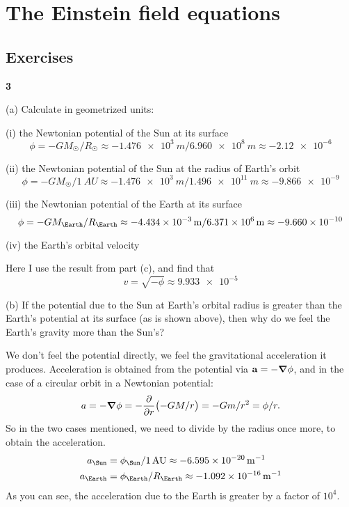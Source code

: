 \documentclass[gr-notes.tex]{subfiles}
\begin{document}
\setcounter{chapter}{7}

\chapter{The Einstein field equations}

\setcounter{section}{5}

\section{Exercises}

\textbf{3}

(a) Calculate in geometrized units:

(i) the Newtonian potential of the Sun at its surface
%
\begin{displaymath}
  \phi =
 -G M_\Sun / R_\Sun \approx
 -\SI{1.476e3}{m} / \SI{6.960e8}{m} \approx
  \num{-2.12e-6}
\end{displaymath}

(ii) the Newtonian potential of the Sun at the radius of Earth's orbit
%
\begin{displaymath}
  \phi =
 -G M_\Sun / \SI{1}{AU} \approx
 -\SI{1.476e3}{m} / \SI{1.496e11}{m} \approx
  \num{-9.866e-9}
\end{displaymath}

(iii) the Newtonian potential of the Earth at its surface
%
\begin{displaymath}
  \phi =
 -G M_\Earth / R_\Earth \approx
 -\SI{4.434e-3}{m} / \SI{6.371e6}{m} \approx
  \num{-9.660e-10}
\end{displaymath}

(iv) the Earth's orbital velocity

Here I use the result from part (c), and find that
%
\begin{displaymath}
  v =
  \sqrt{-\phi} \approx
  \num{9.933e-5}
\end{displaymath}



(b) If the potential due to the Sun at Earth's orbital radius is greater than the Earth's potential at its surface (as is shown above), then why do we feel the Earth's gravity more than the Sun's?

We don't feel the potential directly, we feel the gravitational acceleration it produces. Acceleration is obtained from the potential via $\vb{a} = -\grad\phi$, and in the case of a circular orbit in a Newtonian potential:
%
\begin{displaymath}
  a =
 -\grad\phi =
 -\pdv{r} (-G M / r) =
 -G m / r^2 =
  \phi / r.
\end{displaymath}
%
So in the two cases mentioned, we need to divide by the radius once more, to obtain the acceleration.
%
\begin{align*}
  a_\Sun &=
  \phi_\Sun / \SI{1}{AU} \approx
  \SI{-6.595e-20}{\per\meter}
  \\
  a_\Earth &=
  \phi_\Earth / R_\Earth \approx
  \SI{-1.092e-16}{\per\meter}
\end{align*}
%
As you can see, the acceleration due to the Earth is greater by a factor of $10^4$.
\end{document}
